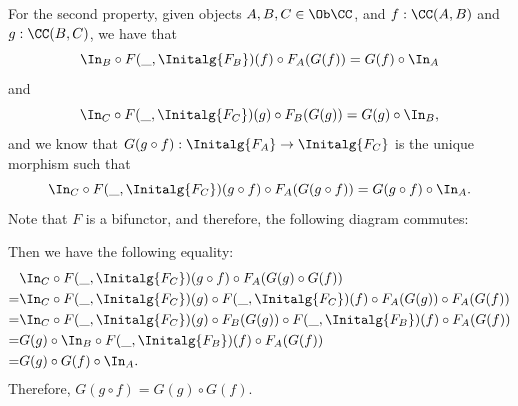 \begin{solution}
	For the second property, given objects $ A, B, C \in \Ob \CC $, and $ f: \CC(A, B) $ and $ g: \CC(B, C) $, we have that
	\[ \In_B \circ F(\_, \Initalg{F_B})(f) \circ F_A(G(f)) = G(f) \circ \In_A \]
	and
	\[ \In_C \circ F(\_, \Initalg{F_C})(g) \circ F_B(G(g)) = G(g) \circ \In_B, \]
	and we know that $ G(g \circ f): \Initalg{F_A} \to \Initalg{F_C} $ is the unique morphism such that
	\[ \In_C \circ F(\_, \Initalg{F_C})(g \circ f) \circ F_A(G(g \circ f)) = G(g \circ f) \circ \In_A. \]
	Note that $ F $ is a bifunctor, and therefore, the following diagram commutes:
	\begin{center}
	\end{center}
	Then we have the following equality:
	\begin{align*}
		& \In_C \circ F(\_, \Initalg{F_C})(g \circ f) \circ F_A(G(g) \circ G(f))\\
		=& \In_C \circ F(\_, \Initalg{F_C})(g) \circ F(\_, \Initalg{F_C})(f) \circ F_A(G(g)) \circ F_A(G(f))\\
		=& \In_C \circ F(\_, \Initalg{F_C})(g) \circ F_B(G(g)) \circ F(\_, \Initalg{F_B})(f) \circ F_A(G(f))\\
		=& G(g) \circ \In_B \circ F(\_, \Initalg{F_B})(f) \circ F_A(G(f))\\
		=& G(g) \circ G(f) \circ \In_A.
	\end{align*}
	Therefore, $ G(g \circ f) = G(g) \circ G(f) $.
\end{solution}

